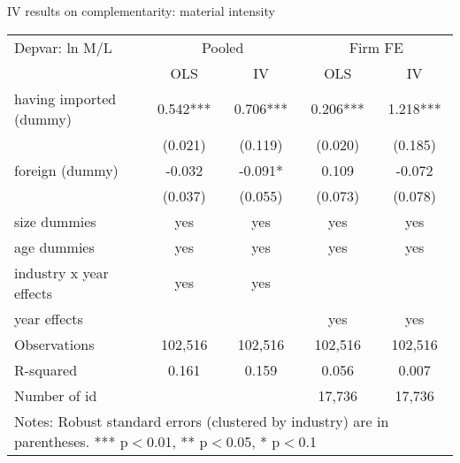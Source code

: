 \documentclass[10pt]{beamer}
\begin{document}
\begin{frame}{IV results on complementarity: material intensity}
\begin{table}
	\renewcommand{\baselinestretch}{1.2}  \scriptsize \centering
	\begin{tabular}{lcccc}
		\hline \hline
    	Depvar: ln M/L & \multicolumn{2}{c}{Pooled} & \multicolumn{2}{c}{Firm FE} \\
		& OLS   & IV    & OLS   & IV \\ \hline
		having imported (dummy) & 0.542*** & 0.706*** & 0.206*** & 1.218*** \\
		& (0.021) & (0.119) & (0.020) & (0.185) \\
		foreign (dummy) & -0.032 & -0.091* & 0.109 & -0.072 \\
		& (0.037) & (0.055) & (0.073) & (0.078) \\
		size dummies & yes   & yes   & yes   & yes \\
		age dummies & yes   & yes   & yes   & yes \\
		industry x year effects & yes   & yes   &       &  \\
		year effects &       &       & yes   & yes \\
		Observations & 102,516 & 102,516 & 102,516 & 102,516 \\
		R-squared & 0.161 & 0.159 & 0.056 & 0.007 \\
		Number of id &       &       & 17,736 & 17,736 \\
		\hline \hline
		\multicolumn{5}{l}{%
			\begin{minipage}{8cm}
				\scriptsize Notes: Robust standard errors (clustered by industry) are in parentheses. *** p$<$0.01, ** p$<$0.05, * p$<$0.1%
			\end{minipage}%
		}\\
	\end{tabular}%
	\renewcommand{\baselinestretch}{1.62}\normalsize \setlength{\baselineskip}{0.65\baselineskip}
\end{table}
\end{frame}
\end{document}
